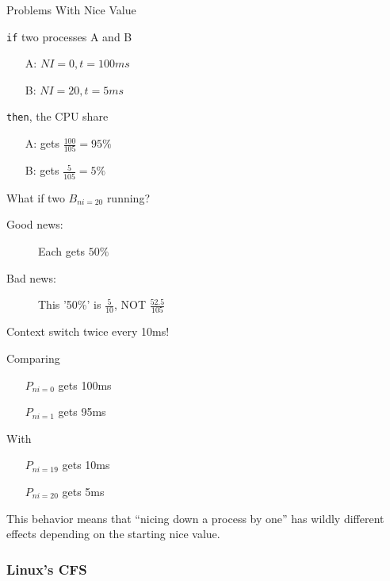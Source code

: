\begin{frame}{Problems With Nice Value}
  \begin{multicols}{2}
    \texttt{if} two processes A and B
    \begin{itemize}
    \item[A:] $NI=0, t=100ms$
    \item[B:] $NI=20, t=5ms$
    \end{itemize}\vfill\columnbreak
    \texttt{then}, the CPU share
    \begin{itemize}
    \item[A:] gets $\frac{100}{105} = 95\%$
    \item[B:] gets $\frac{5}{105} = 5\%$
    \end{itemize}
  \end{multicols}
  \begin{block}{What if two $B_{ni=20}$ running?}
    \begin{description}
    \item[Good news:] Each gets $50\%$
    \item[Bad news:] This '50\%' is $\frac{5}{10}$, NOT $\frac{52.5}{105}$
    \end{description}
    Context switch twice every 10ms!
  \end{block}
\end{frame}

\begin{frame}
  \begin{multicols}{2}
    Comparing
    \begin{itemize}
    \item[] $P_{ni=0}$ gets 100ms
    \item[] $P_{ni=1}$ gets 95ms
    \end{itemize}\vfill\columnbreak
    With
    \begin{itemize}
    \item[] $P_{ni=19}$ gets 10ms
    \item[] $P_{ni=20}$ gets 5ms
    \end{itemize}
  \end{multicols}
  This behavior means that ``nicing down a process by one'' has wildly different effects
  depending on the starting nice value.
\end{frame}

\subsubsection{Linux's CFS}

